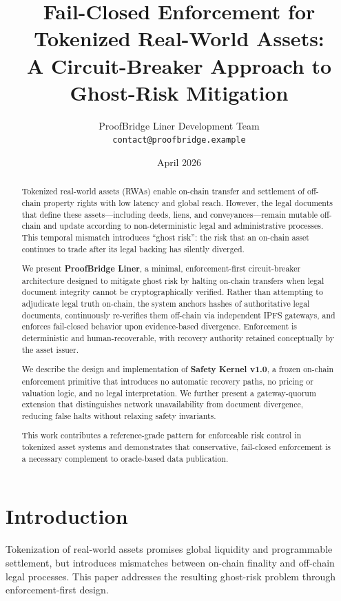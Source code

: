 \documentclass[11pt]{article}
\title{
Fail-Closed Enforcement for Tokenized Real-World Assets:\\
A Circuit-Breaker Approach to Ghost-Risk Mitigation
}
\author{
ProofBridge Liner Development Team\\
\texttt{contact@proofbridge.example}
}
\date{April 2026}
\begin{document}
\maketitle

\begin{abstract}
Tokenized real-world assets (RWAs) enable on-chain transfer and settlement
of off-chain property rights with low latency and global reach. However,
the legal documents that define these assets---including deeds, liens,
and conveyances---remain mutable off-chain and update according to
non-deterministic legal and administrative processes. This temporal mismatch
introduces ``ghost risk'': the risk that an on-chain asset continues to trade
after its legal backing has silently diverged.

We present \textbf{ProofBridge Liner}, a minimal, enforcement-first
circuit-breaker architecture designed to mitigate ghost risk by halting
on-chain transfers when legal document integrity cannot be cryptographically
verified. Rather than attempting to adjudicate legal truth on-chain, the
system anchors hashes of authoritative legal documents, continuously
re-verifies them off-chain via independent IPFS gateways, and enforces
fail-closed behavior upon evidence-based divergence. Enforcement is
deterministic and human-recoverable, with recovery authority retained
conceptually by the asset issuer.

We describe the design and implementation of \textbf{Safety Kernel v1.0},
a frozen on-chain enforcement primitive that introduces no automatic recovery
paths, no pricing or valuation logic, and no legal interpretation. We further
present a gateway-quorum extension that distinguishes network unavailability
from document divergence, reducing false halts without relaxing safety
invariants.

This work contributes a reference-grade pattern for enforceable risk control
in tokenized asset systems and demonstrates that conservative, fail-closed
enforcement is a necessary complement to oracle-based data publication.
\end{abstract}

\section{Introduction}
Tokenization of real-world assets promises global liquidity and
programmable settlement, but introduces mismatches between on-chain
finality and off-chain legal processes. This paper addresses the resulting
ghost-risk problem through enforcement-first design.
\end{document}
